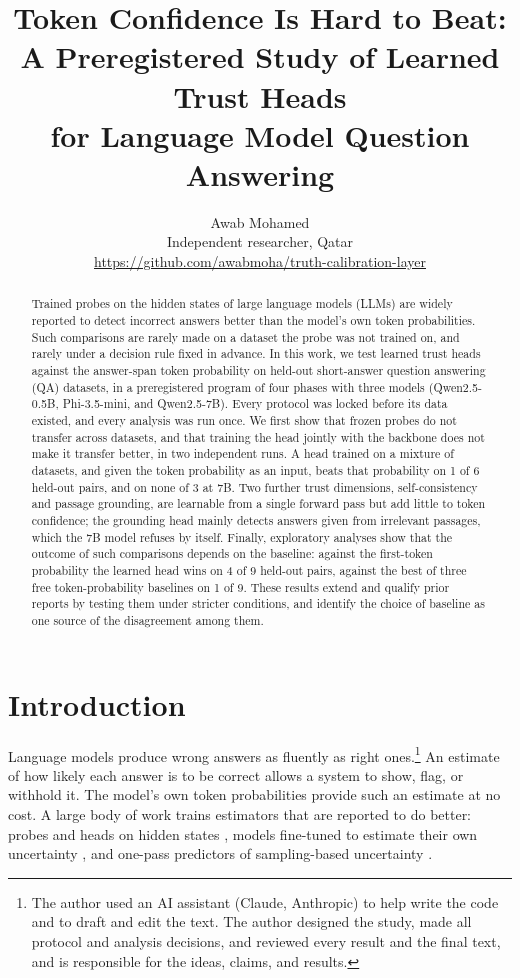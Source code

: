 \documentclass[10pt]{article}
\title{Token Confidence Is Hard to Beat:\\A Preregistered Study of Learned Trust Heads\\for Language Model Question Answering}
\author{\name Awab Mohamed \\
  \addr Independent researcher, Qatar\\
  \url{https://github.com/awabmoha/truth-calibration-layer}}
\begin{document}
\maketitle

\begin{abstract}
Trained probes on the hidden states of large language models (LLMs) are widely reported to detect incorrect answers better than the model's own token probabilities. Such comparisons are rarely made on a dataset the probe was not trained on, and rarely under a decision rule fixed in advance. In this work, we test learned trust heads against the answer-span token probability on held-out short-answer question answering (QA) datasets, in a preregistered program of four phases with three models (Qwen2.5-0.5B, Phi-3.5-mini, and Qwen2.5-7B). Every protocol was locked before its data existed, and every analysis was run once. We first show that frozen probes do not transfer across datasets, and that training the head jointly with the backbone does not make it transfer better, in two independent runs. A head trained on a mixture of datasets, and given the token probability as an input, beats that probability on 1 of 6 held-out pairs, and on none of 3 at 7B. Two further trust dimensions, self-consistency and passage grounding, are learnable from a single forward pass but add little to token confidence; the grounding head mainly detects answers given from irrelevant passages, which the 7B model refuses by itself. Finally, exploratory analyses show that the outcome of such comparisons depends on the baseline: against the first-token probability the learned head wins on 4 of 9 held-out pairs, against the best of three free token-probability baselines on 1 of 9. These results extend and qualify prior reports by testing them under stricter conditions, and identify the choice of baseline as one source of the disagreement among them.
\end{abstract}

\section{Introduction}

Language models produce wrong answers as fluently as right ones.\footnote{The author used an AI assistant (Claude, Anthropic) to help write the code and to draft and edit the text. The author designed the study, made all protocol and analysis decisions, and reviewed every result and the final text, and is responsible for the ideas, claims, and results.} An estimate of how likely each answer is to be correct allows a system to show, flag, or withhold it. The model's own token probabilities provide such an estimate at no cost. A large body of work trains estimators that are reported to do better: probes and heads on hidden states \citep{azaria-mitchell-2023-internal,marks2024geometry,orgad2025llms,liu2024universal}, models fine-tuned to estimate their own uncertainty \citep{kapoor2024large}, and one-pass predictors of sampling-based uncertainty \citep{kossen2024semantic,vashurin2025cocoa}.
\end{document}
